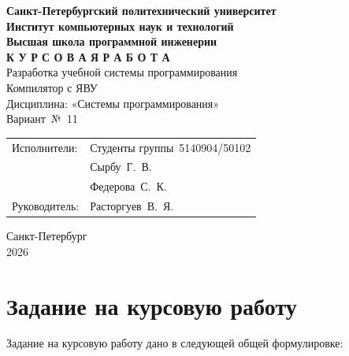\documentclass[a4paper,14pt]{extarticle}
\begin{document}
\thispagestyle{empty}
\begin{center}
  \textbf{Санкт-Петербургский политехнический университет}\\
  \textbf{Институт компьютерных наук и технологий}\\
  \textbf{Высшая школа программной инженерии}\\[3cm]

  {\Large\textbf{К У Р С О В А Я \quad Р А Б О Т А}}\\[1cm]
  {\large Разработка учебной системы программирования}\\[0.5cm]
  {\large Компилятор с ЯВУ}\\[2cm]

  Дисциплина: «Системы программирования»\\[1cm]
  Вариант~№~11\\[2cm]
\end{center}

\begin{flushright}
  \begin{tabular}{ll}
    Исполнители: & Студенты группы~5140904/50102\\
                 & Сырбу~Г.~В.\\
                 & Федерова~С.~К.\\[0.5cm]
    Руководитель: & Расторгуев~В.~Я.\\
  \end{tabular}
\end{flushright}

\vfill
\begin{center}
  Санкт-Петербург\\
  2026
\end{center}

\newpage

\tableofcontents
\newpage

\section{Задание на курсовую работу}

Задание на курсовую работу дано в следующей общей формулировке:
\end{document}
